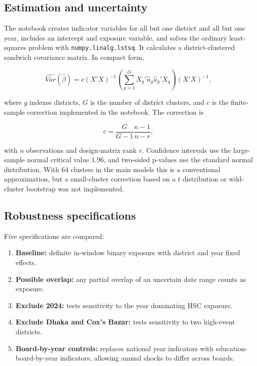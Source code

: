 \documentclass[11pt]{article}
\begin{document}
\subsection{Estimation and uncertainty}

The notebook creates indicator variables for all but one district and all but one year, includes an intercept and exposure variable, and solves the ordinary least-squares problem with \texttt{numpy.linalg.lstsq}. It calculates a district-clustered sandwich covariance matrix. In compact form,

\begin{equation}
\widehat{Var}(\hat\beta)=c(X'X)^{-1}
\left(\sum_{g=1}^{G}X_g'\hat u_g\hat u_g'X_g\right)(X'X)^{-1},
\end{equation}

where $g$ indexes districts, $G$ is the number of district clusters, and $c$ is the finite-sample correction implemented in the notebook. The correction is

\begin{equation}
c=\frac{G}{G-1}\frac{n-1}{n-r},
\end{equation}

with $n$ observations and design-matrix rank $r$. Confidence intervals use the large-sample normal critical value 1.96, and two-sided p-values use the standard normal distribution. With 64 clusters in the main models this is a conventional approximation, but a small-cluster correction based on a $t$ distribution or wild-cluster bootstrap was not implemented.

\subsection{Robustness specifications}

Five specifications are compared:

\begin{enumerate}
  \item \textbf{Baseline:} definite in-window binary exposure with district and year fixed effects.
  \item \textbf{Possible overlap:} any partial overlap of an uncertain date range counts as exposure.
  \item \textbf{Exclude 2024:} tests sensitivity to the year dominating HSC exposure.
  \item \textbf{Exclude Dhaka and Cox's Bazar:} tests sensitivity to two high-event districts.
  \item \textbf{Board-by-year controls:} replaces national year indicators with education-board-by-year indicators, allowing annual shocks to differ across boards.
\end{enumerate}
\end{document}
